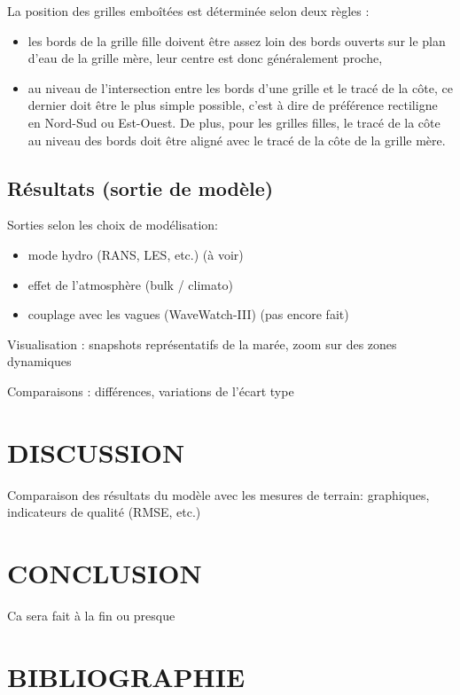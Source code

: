 \documentclass[10pt,a4paper,titlepage]{article}
\begin{document}
La position des grilles emboîtées est déterminée selon deux règles :
\begin{itemize}
    \item les bords de la grille fille doivent être assez loin des bords ouverts sur le plan d'eau de la grille mère, leur centre est donc généralement proche,
    \item au niveau de l'intersection entre les bords d'une grille et le tracé de la côte, ce dernier doit être le plus simple possible, c'est à dire de préférence rectiligne en Nord-Sud ou Est-Ouest.
    De plus, pour les grilles filles, le tracé de la côte au niveau des bords doit être aligné avec le tracé de la côte de la grille mère.
\end{itemize}

\subsection{Résultats (sortie de modèle)}

Sorties selon les choix de modélisation:
\begin{itemize}
    \item mode hydro (RANS, LES, etc.) (à voir)
    \item effet de l'atmosphère (bulk / climato)
    \item couplage avec les vagues (WaveWatch-III) (pas encore fait)
\end{itemize}

Visualisation : snapshots représentatifs de la marée, zoom sur des zones dynamiques

Comparaisons : différences, variations de l'écart type

\newpage

\section{DISCUSSION}

Comparaison des résultats du modèle avec les mesures de terrain: graphiques, indicateurs de qualité (RMSE, etc.)

\newpage

\section{CONCLUSION}

Ca sera fait à la fin ou presque

\section*{BIBLIOGRAPHIE}
\printbibliography
\end{document}
